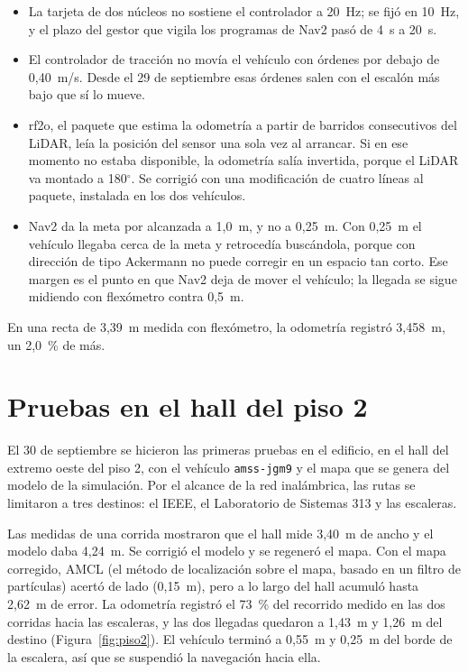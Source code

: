 \documentclass[12pt,letterpaper]{article}
\begin{document}
\begin{itemize}[leftmargin=*]
    \item La tarjeta de dos núcleos no sostiene el controlador a 20~Hz; se fijó en 10~Hz, y el plazo del gestor que vigila los programas de Nav2 pasó de 4~s a 20~s.
    \item El controlador de tracción no movía el vehículo con órdenes por debajo de 0,40~m/s. Desde el 29 de septiembre esas órdenes salen con el escalón más bajo que sí lo mueve.
    \item rf2o, el paquete que estima la odometría a partir de barridos consecutivos del LiDAR, leía la posición del sensor una sola vez al arrancar. Si en ese momento no estaba disponible, la odometría salía invertida, porque el LiDAR va montado a 180$^\circ$. Se corrigió con una modificación de cuatro líneas al paquete, instalada en los dos vehículos.
    \item Nav2 da la meta por alcanzada a 1,0~m, y no a 0,25~m. Con 0,25~m el vehículo llegaba cerca de la meta y retrocedía buscándola, porque con dirección de tipo Ackermann no puede corregir en un espacio tan corto. Ese margen es el punto en que Nav2 deja de mover el vehículo; la llegada se sigue midiendo con flexómetro contra 0,5~m.
\end{itemize}

En una recta de 3,39~m medida con flexómetro, la odometría registró 3,458~m, un 2,0~\% de más.

\section{Pruebas en el hall del piso 2}
\label{sec:piso2}

El 30 de septiembre se hicieron las primeras pruebas en el edificio, en el hall del extremo oeste del piso 2, con el vehículo \texttt{amss-jgm9} y el mapa que se genera del modelo de la simulación. Por el alcance de la red inalámbrica, las rutas se limitaron a tres destinos: el IEEE, el Laboratorio de Sistemas 313 y las escaleras.

Las medidas de una corrida mostraron que el hall mide 3,40~m de ancho y el modelo daba 4,24~m. Se corrigió el modelo y se regeneró el mapa. Con el mapa corregido, AMCL (el método de localización sobre el mapa, basado en un filtro de partículas) acertó de lado (0,15~m), pero a lo largo del hall acumuló hasta 2,62~m de error. La odometría registró el 73~\% del recorrido medido en las dos corridas hacia las escaleras, y las dos llegadas quedaron a 1,43~m y 1,26~m del destino (Figura~\ref{fig:piso2}). El vehículo terminó a 0,55~m y 0,25~m del borde de la escalera, así que se suspendió la navegación hacia ella.
\end{document}
